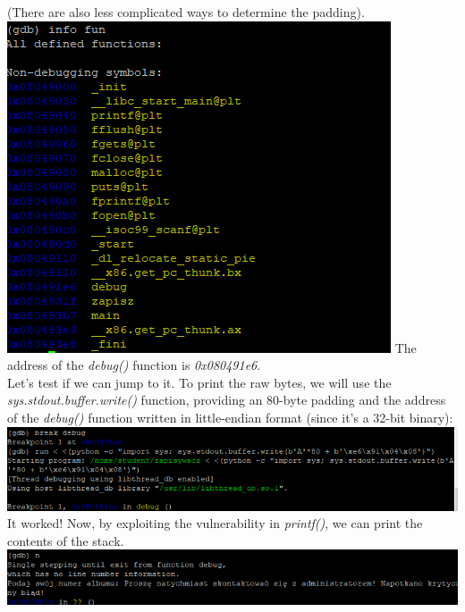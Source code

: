\documentclass{article}
\begin{document}
\vspace{3mm}
(There are also less complicated ways to determine the padding). \\
\includegraphics[width=\textwidth]{"image52.png"}
The address of the \textit{debug()} function is \textit{0x080491e6}.
\vspace{3mm} \\
Let’s test if we can jump to it. To print the raw bytes, we will use the \textit{sys.stdout.buffer.write()} function, providing an 80-byte padding and the address of the \textit{debug()} function written in little-endian format (since it's a 32-bit binary):
\vspace{3mm} \\
\includegraphics[width=\textwidth]{"image53.png"}
It worked! Now, by exploiting the vulnerability in \textit{printf()}, we can print the contents of the stack.
\vspace{3mm} \\
\includegraphics[width=\textwidth]{"image54.png"}
\end{document}
